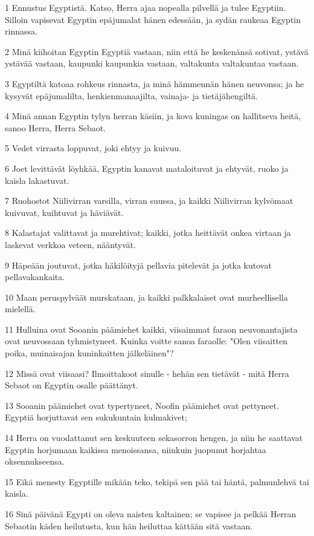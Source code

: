 \par 1 Ennustus Egyptistä. Katso, Herra ajaa nopealla pilvellä ja tulee Egyptiin. Silloin vapisevat Egyptin epäjumalat hänen edessään, ja sydän raukeaa Egyptin rinnassa.
\par 2 Minä kiihoitan Egyptin Egyptiä vastaan, niin että he keskenänsä sotivat, ystävä ystävää vastaan, kaupunki kaupunkia vastaan, valtakunta valtakuntaa vastaan.
\par 3 Egyptiltä katoaa rohkeus rinnasta, ja minä hämmennän hänen neuvonsa; ja he kysyvät epäjumalilta, henkienmanaajilta, vainaja- ja tietäjähengiltä.
\par 4 Minä annan Egyptin tylyn herran käsiin, ja kova kuningas on hallitseva heitä, sanoo Herra, Herra Sebaot.
\par 5 Vedet virrasta loppuvat, joki ehtyy ja kuivuu.
\par 6 Joet levittävät löyhkää, Egyptin kanavat mataloituvat ja ehtyvät, ruoko ja kaisla lakastuvat.
\par 7 Ruohostot Niilivirran varsilla, virran suussa, ja kaikki Niilivirran kylvömaat kuivuvat, kuihtuvat ja häviävät.
\par 8 Kalastajat valittavat ja murehtivat; kaikki, jotka heittävät onkea virtaan ja laskevat verkkoa veteen, nääntyvät.
\par 9 Häpeään joutuvat, jotka häkilöityjä pellavia pitelevät ja jotka kutovat pellavakankaita.
\par 10 Maan peruspylväät murskataan, ja kaikki palkkalaiset ovat murheellisella mielellä.
\par 11 Hulluina ovat Sooanin päämiehet kaikki, viisaimmat faraon neuvonantajista ovat neuvossaan tyhmistyneet. Kuinka voitte sanoa faraolle: "Olen viisaitten poika, muinaisajan kuninkaitten jälkeläinen"?
\par 12 Missä ovat viisaasi? Ilmoittakoot sinulle - hehän sen tietävät - mitä Herra Sebaot on Egyptin osalle päättänyt.
\par 13 Sooanin päämiehet ovat typertyneet, Noofin päämiehet ovat pettyneet. Egyptiä horjuttavat sen sukukuntain kulmakivet;
\par 14 Herra on vuodattanut sen keskuuteen sekasorron hengen, ja niin he saattavat Egyptin horjumaan kaikissa menoissansa, niinkuin juopunut horjahtaa oksennukseensa.
\par 15 Eikä menesty Egyptille mikään teko, tekipä sen pää tai häntä, palmunlehvä tai kaisla.
\par 16 Sinä päivänä Egypti on oleva naisten kaltainen; se vapisee ja pelkää Herran Sebaotin käden heilutusta, kun hän heiluttaa kättään sitä vastaan.
